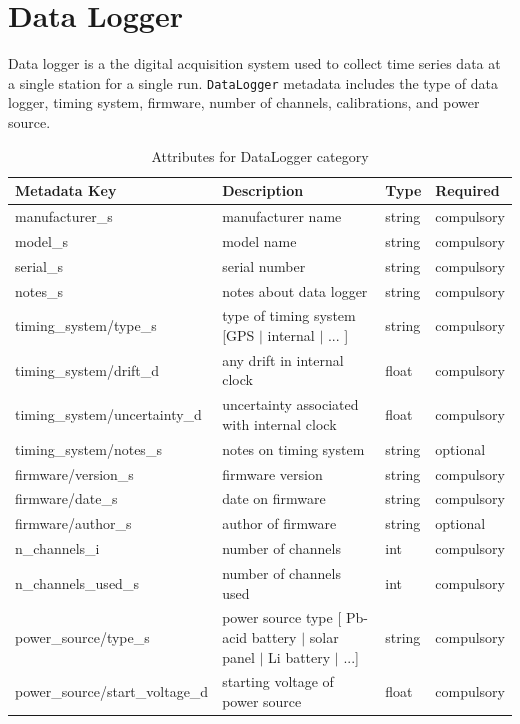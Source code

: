 \documentclass{article}
\begin{document}
\newpage
\section{Data Logger}

Data logger is a the digital acquisition system used to collect time series data at a single station for a single run.  \verb|DataLogger| metadata includes the type of data logger, timing system, firmware, number of channels, calibrations, and power source.

\begin{table}[htb!]
	\caption[Attributes for DataLogger]{Attributes for DataLogger category}
	\begin{tabular}{|l|p{3in}|l|l|}
		\hline
		\textbf{Metadata Key} & \textbf{Description} & \textbf{Type} & \textbf{Required} \\ \hline
		manufacturer\_s & manufacturer name & string & compulsory \\ \hline
		model\_s & model name & string & compulsory \\ \hline
		serial\_s & serial number & string & compulsory \\ \hline
		notes\_s & notes about data logger & string & compulsory \\ \hline
		timing\_system/type\_s & type of timing system [GPS $|$ internal $|$ ... ] & string & compulsory \\ \hline
		timing\_system/drift\_d & any drift in internal clock & float & compulsory \\ \hline
		timing\_system/uncertainty\_d & uncertainty associated with internal clock & float & compulsory \\ \hline
		timing\_system/notes\_s & notes on timing system & string & optional \\ \hline
		firmware/version\_s & firmware version & string & compulsory \\ \hline
		firmware/date\_s & date on firmware & string & compulsory \\ \hline
		firmware/author\_s & author of firmware & string & optional \\ \hline
		n\_channels\_i & number of channels & int & compulsory \\ \hline
		n\_channels\_used\_s & number of channels used & int & compulsory \\ \hline
		power\_source/type\_s & power source type [ Pb-acid battery $|$ solar panel $|$ Li battery $|$ ...] & string & compulsory \\ \hline
		power\_source/start\_voltage\_d & starting voltage of power source & float & compulsory \\ \hline

\end{tabular}
\end{table}
\end{document}
